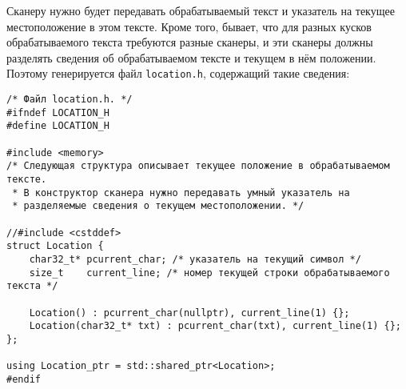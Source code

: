 \documentclass[10pt]{report}
\newcounter{defin}[section]
\begin{document}
Сканеру нужно будет передавать обрабатываемый текст и указатель на текущее местоположение в этом тексте. Кроме того, бывает, что для разных кусков обрабатываемого текста требуются разные сканеры, и эти сканеры должны разделять сведения об обрабатываемом тексте и текущем в нём положении. Поэтому генерируется файл \texttt{location.h}, содержащий такие сведения:
\begin{verbatim}
/* Файл location.h. */
#ifndef LOCATION_H
#define LOCATION_H

#include <memory>
/* Следующая структура описывает текущее положение в обрабатываемом тексте.
 * В конструктор сканера нужно передавать умный указатель на
 * разделяемые сведения о текущем местоположении. */

//#include <cstddef>
struct Location {
    char32_t* pcurrent_char; /* указатель на текущий символ */
    size_t    current_line; /* номер текущей строки обрабатываемого текста */

    Location() : pcurrent_char(nullptr), current_line(1) {};
    Location(char32_t* txt) : pcurrent_char(txt), current_line(1) {};
};

using Location_ptr = std::shared_ptr<Location>;
#endif
\end{verbatim}
\end{document}
